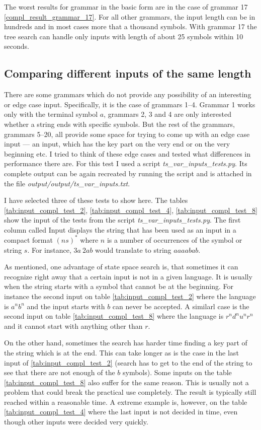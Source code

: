 The worst results for grammar in the basic form are in the case of grammar 17 \ref{compl_result_grammar_17}. For all other grammars, the input length can be in hundreds and in most cases more that a thousand symbols. With grammar 17 the tree search can handle only inputs with length of about 25 symbols within 10 seconds.

\subsection{Comparing different inputs of the same length}
There are some grammars which do not provide any possibility of an interesting or edge case input. Specifically, it is the case of grammars 1--4. Grammar 1 works only with the terminal symbol $a$, grammars 2, 3 and 4 are only interested whether a string ends with specific symbols. But the rest of the grammars, grammars 5--20, all provide some space for trying to come up with an edge case input --- an input, which has the key part on the very end or on the very beginning etc. I tried to think of these edge cases and tested what differences in performance there are. For this test I used a script \textit{ts\_var\_inputs\_tests.py}. Its complete output can be again recreated by running the script and is attached in the file \textit{output/output/ts\_var\_inputs.txt}.

I have selected three of these tests to show here. The tables \ref{tab:input_compl_test_2}, \ref{tab:input_compl_test_4}, \ref{tab:input_compl_test_8}  show the input of the tests from the script \textit{ts\_var\_inputs\_tests.py}. The first column called Input displays the string that has been used as an input in a compact format $(ns)^*$ where $n$ is a number of occurrences of the symbol or string $s$. For instance, $3a\:2ab$ would translate to string $aaaabab$.

As mentioned, one advantage of state space search is, that sometimes it can recognize right away that a certain input is not in a given language. It is usually when the string starts with a symbol that cannot be at the beginning. For instance the second input on table \ref{tab:input_compl_test_2} where the language is $a^nb^n$ and the input starts with $b$ can never be accepted. A similarl case is the second input on table \ref{tab:input_compl_test_8} where the language is $r^nd^nu^nr^n$ and it cannot start with anything other than $r$.

On the other hand, sometimes the search has harder time finding a key part of the string which is at the end. This can take longer as is the case in the last input of \ref{tab:input_compl_test_2} (search has to get to the end of the string to see that there are not enough of the $b$ symbols). Some inputs on the table \ref{tab:input_compl_test_8} also suffer for the same reason. This is usually not a problem that could break the practical use completely. The result is typically still reached within a reasonable time. A extreme example is, however, on the table \ref{tab:input_compl_test_4} where the last input is not decided in time, even though other inputs were decided very quickly.


